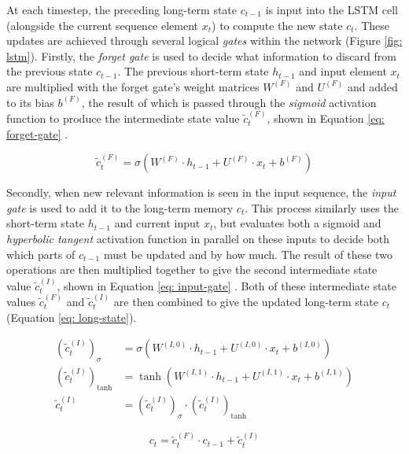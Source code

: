 \documentclass[a4paper, 11pt]{report}
\begin{document}
    At each timestep, the preceding long-term state $c_{t-1}$ is input into the LSTM cell (alongside the current sequence element $x_t$) to compute the new state $c_t$. These updates are achieved through several logical \emph{gates} within the network (Figure \ref{fig: lstm}). Firstly, the \emph{forget gate} is used to decide what information to discard from the previous state $c_{t-1}$. The previous short-term state $h_{t-1}$ and input element $x_t$ are multiplied with the forget gate's weight matrices $W^{(F)}$ and $U^{(F)}$ and added to its bias $b^{(F)}$, the result of which is passed through the \emph{sigmoid} activation function to produce the intermediate state value $\tilde{c}^{(F)}_t$, shown in Equation \ref{eq: forget-gate} \citep{zhang-2021}.

    \begin{equation}
        \label{eq: forget-gate}
        \tilde{c}^{(F)}_t = \sigma( W^{(F)} \cdot h_{t-1} + U^{(F)} \cdot x_t + b^{(F)} )
    \end{equation}

    Secondly, when new relevant information is seen in the input sequence, the \emph{input gate} is used to add it to the long-term memory $c_t$. This process similarly uses the short-term state $h_{t-1}$ and current input $x_t$, but evaluates both a sigmoid and \emph{hyperbolic tangent} activation function in parallel on these inputs to decide both which parts of $c_{t-1}$ must be updated and by how much. The result of these two operations are then multiplied together to give the second intermediate state value $\tilde{c}^{(I)}_t$, shown in Equation \ref{eq: input-gate} \citep{zhang-2021}. Both of these intermediate state values $\tilde{c}^{(F)}_t$ and $\tilde{c}^{(I)}_t$ are then combined to give the updated long-term state $c_t$ (Equation \ref{eq: long-state}).

    \begin{align}
        \label{eq: input-gate}
        (\tilde{c}^{(I)}_t)_{\sigma} &= \sigma( W^{(I,0)} \cdot h_{t-1} + U^{(I,0)} \cdot x_t + b^{(I,0)} ) \\
        (\tilde{c}^{(I)}_t)_{\tanh} &= \tanh{( W^{(I,1)} \cdot h_{t-1} + U^{(I,1)} \cdot x_t + b^{(I,1)} )} \\
        \tilde{c}^{(I)}_t &= (\tilde{c}^{(I)}_t)_{\sigma} \cdot (\tilde{c}^{(I)}_t)_{\tanh}
    \end{align}

    \begin{equation}
        \label{eq: long-state}
        c_t = \tilde{c}^{(F)}_t \cdot c_{t-1} + \tilde{c}^{(I)}_t
    \end{equation}
\end{document}
